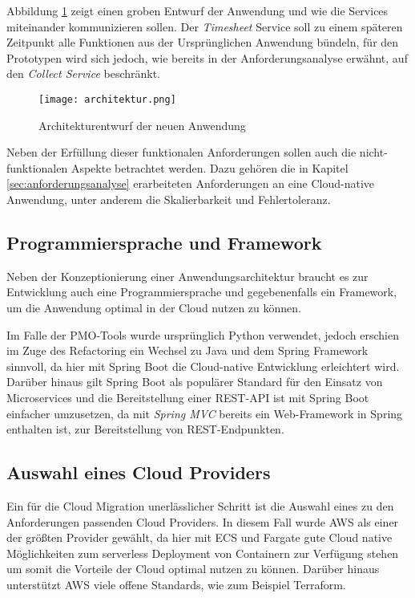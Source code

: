 Abbildung \ref{fig:Architektur} zeigt einen groben  Entwurf der Anwendung und wie die Services miteinander kommunizieren sollen. Der \textit{\gls{Timesheet}} Service soll zu einem späteren Zeitpunkt alle Funktionen aus der Ursprünglichen Anwendung bündeln, für den Prototypen wird sich jedoch, wie bereits in der Anforderungsanalyse erwähnt, auf den \textit{Collect Service} beschränkt.

\begin{figure}[H]
    \centering
    \texttt{[image: architektur.png]}
    \caption{Architekturentwurf der neuen Anwendung}
    \label{fig:Architektur}
\end{figure}

Neben der Erfüllung dieser funktionalen Anforderungen sollen auch die nicht-funktionalen Aspekte betrachtet werden. Dazu gehören die in Kapitel \ref{sec:anforderungsanalyse} erarbeiteten Anforderungen an eine Cloud-native Anwendung, unter anderem die Skalierbarkeit und Fehlertoleranz. \pagebreak

\subsection{Programmiersprache und Framework}
Neben der Konzeptionierung einer Anwendungsarchitektur braucht es zur Entwicklung auch eine Programmiersprache und gegebenenfalls ein Framework, um die Anwendung optimal in der Cloud nutzen zu können. 

Im Falle der PMO-Tools wurde ursprünglich Python verwendet, jedoch erschien im Zuge des Refactoring ein Wechsel zu Java und dem \gls{Spring} Framework sinnvoll, da hier mit \gls{Spring Boot} die Cloud-native Entwicklung erleichtert wird. Darüber hinaus gilt \gls{Spring Boot} als populärer Standard für den Einsatz von Microservices und die Bereitstellung einer \ac{REST}-\ac{API} ist mit \gls{Spring Boot} einfacher umzusetzen, da mit \textit{Spring MVC} bereits ein Web-Framework in \gls{Spring} enthalten ist, zur Bereitstellung von \ac{REST}-Endpunkten.

\subsection{Auswahl eines Cloud Providers}
Ein für die Cloud Migration unerlässlicher Schritt ist die Auswahl eines zu den Anforderungen passenden Cloud Providers. In diesem Fall wurde \ac{AWS} als einer der größten Provider \cite[Vgl.][S. 6]{Sustar2022} gewählt, da hier mit \ac{ECS} und \gls{Fargate} gute Cloud native Möglichkeiten zum serverless Deployment von Containern zur Verfügung stehen um somit die Vorteile der Cloud optimal nutzen zu können. Darüber hinaus unterstützt \ac{AWS} viele offene Standards, wie zum Beispiel Terraform.

